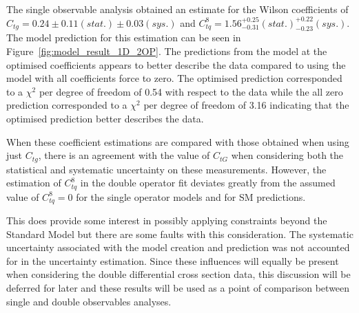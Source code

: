 \documentclass[a4paper,11pt]{article}
\begin{document}
The single observable analysis obtained an estimate for the Wilson coefficients of $C_{tg} = 0.24 \pm 0.11 (stat.) \pm 0.03 (sys.)$ and $C_{tq}^{8}=1.56^{+0.25}_{-0.31} (stat.) ^{+0.22}_{-0.23} (sys.)$.
The model prediction for this estimation can be seen in Figure~\ref{fig:model_result_1D_2OP}.
The predictions from the model at the optimised coefficients appears to better describe the data compared to using the model with all coefficients force to zero.
The optimised prediction corresponded to a $\chi^{2}$ per degree of freedom of 0.54 with respect to the data while the all zero prediction corresponded to a $\chi^{2}$ per degree of freedom of 3.16 indicating that the optimised prediction better describes the data.

When these coefficient estimations are compared with those obtained when using just $C_{tg}$, there is an agreement with the value of $C_{tG}$ when considering both the statistical and systematic uncertainty on these measurements.
However, the estimation of $C_{tq}^{8}$ in the double operator fit deviates greatly from the assumed value of $C_{tq}^{8}=0$ for the single operator models and for SM predictions.

This does provide some interest in possibly applying constraints beyond the Standard Model but there are some faults with this consideration.
The systematic uncertainty associated with the model creation and prediction was not accounted for in the uncertainty estimation.
Since these influences will equally be present when considering the double differential cross section data, this discussion will be deferred for later and these results will be used as a point of comparison between single and double observables analyses.
\end{document}
